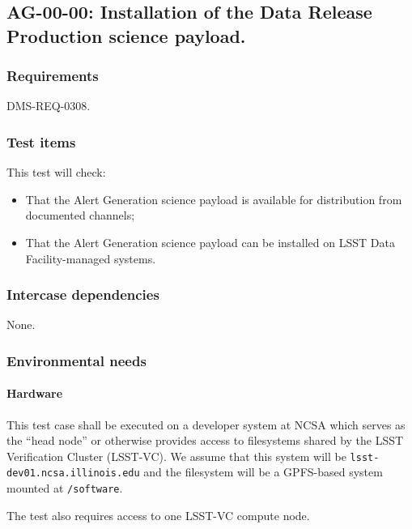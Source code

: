 \subsection{AG-00-00: Installation of the Data Release Production science payload.}
\label{ag-00-00}

\subsubsection{Requirements}

DMS-REQ-0308.

\subsubsection{Test items}

This test will check:

\begin{itemize}

  \item{That the Alert Generation science payload is available for
  distribution from documented channels;}

  \item{That the Alert Generation science payload can be installed on
  LSST Data Facility-managed systems.}

\end{itemize}

\subsubsection{Intercase dependencies}

None.

\subsubsection{Environmental needs}

\paragraph{Hardware}

This test case shall be executed on a developer system at NCSA which serves as
the ``head node'' or otherwise provides access to filesystems shared by the
LSST Verification Cluster (LSST-VC). We assume that this system will be
\texttt{lsst-dev01.ncsa.illinois.edu} and the filesystem will be a GPFS-based
system mounted at \texttt{/software}.

The test also requires access to one LSST-VC compute node.

